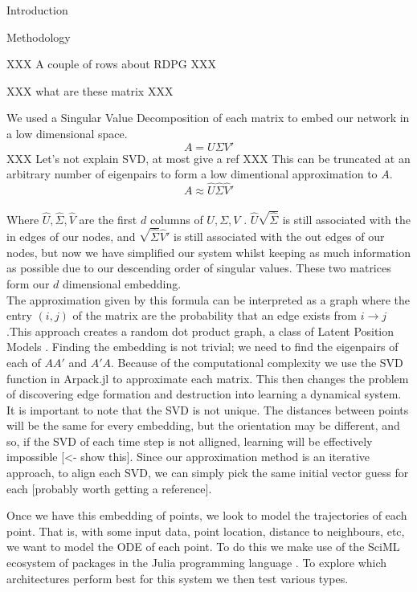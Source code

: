 \documentclass{article}
\begin{document}
\begin{section}{Introduction}
\end{section}

\begin{section}{Methodology}

    XXX A couple of rows about RDPG XXX

    XXX what are these matrix XXX

    We used a Singular Value Decomposition of each matrix to embed our network in a low dimensional space.\
        \[
        A = U\Sigma V'
        \]
    XXX Let's not explain SVD, at most give a ref XXX
    This can be truncated at an arbitrary number of eigenpairs to form a low dimentional approximation to $A$.
        \[
        A \approx \hat U \hat \Sigma \hat V'
        \]\\
    Where $\hat U, \hat \Sigma, \hat V$ are the first $d$ columns of $U, \Sigma, V$ \cite{golub1971singular}. $\hat U \sqrt{\hat \Sigma}$ is still associated with the in edges of our nodes, and $\sqrt{\hat \Sigma} \hat V' $ is still associated with the out edges of our nodes, but now we have simplified our system whilst keeping as much information as possible due to our descending order of singular values. These two matrices form our $d$ dimensional embedding.\\

    The approximation given by this formula can be interpreted as a graph where the entry $(i,j)$ of the matrix are the probability that an edge exists from $i \rightarrow j$.This approach creates a random dot product graph\cite{athreya2017statistical}, a class of Latent Position Models \cite{hoff2002latent}. Finding the embedding is not trivial; we need to find the eigenpairs of each of $AA'$ and $A'A$. Because of the computational complexity we use the SVD function in Arpack.jl to approximate each matrix. This then changes the problem of discovering edge formation and destruction into learning a dynamical system.\\
    It is important to note that the SVD is not unique. The distances between points will be the same for every embedding, but the orientation may be different, and so, if the SVD of each time step is not alligned, learning will be effectively impossible [<- show this]. Since our approximation method is an iterative approach, to align each SVD, we can simply pick the same initial vector guess for each [probably worth getting a reference].  
    
    Once we have this embedding of points, we look to model the trajectories of each point. That is, with some input data, point location, distance to neighbours, etc, we want to model the ODE of each point. To do this we make use of the SciML ecosystem of packages in the Julia programming language \cite{SciML_C_Rak}. To explore which architectures perform best for this system we then test various types. ~~~~~~~~~~~~~~~~~~~~~~~~\\
    

\end{section}
\end{document}

